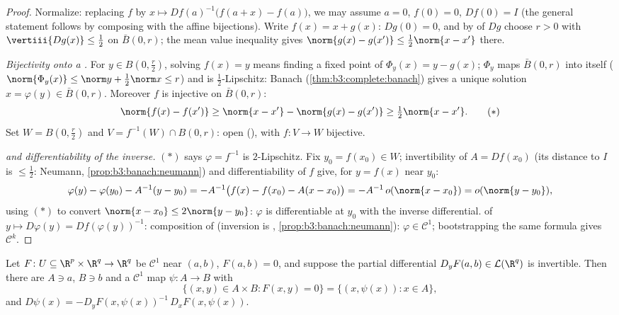 \begin{proof}
Normalize: replacing $f$ by $x \mapsto Df(a)^{-1}\bigl(f(a +
x) - f(a)\bigr)$, we may assume $a = 0$, $f(0) = 0$, $Df(0) =
I$ (the general statement follows by composing with the
affine bijections). Write $f(x) = x + g(x)$: $Dg(0) = 0$, and
by  of $Dg$ choose $r > 0$ with
$\vertiii{Dg(x)} \leq \frac12$ on $\bar B(0, r)$; the mean
value inequality gives $\norm{g(x) - g(x')} \leq \frac12
\norm{x - x'}$ there.

\emph{Bijectivity onto a .} For $y \in B(0,
\frac r2)$, solving $f(x) = y$ means finding a fixed point of
$\Phi_y(x) = y - g(x)$; $\Phi_y$ maps $\bar B(0, r)$ into
itself ($\norm{\Phi_y(x)} \leq \norm y + \frac12\norm x \leq
r$) and is $\frac12$-Lipschitz: Banach
(\cref{thm:b3:complete:banach}) gives a unique solution
$x = \varphi(y) \in \bar B(0,r)$. Moreover $f$ is injective
on $\bar B(0,r)$:
\[
\norm{f(x) - f(x')} \geq \norm{x - x'} - \norm{g(x) - g(x')}
\geq \tfrac12\norm{x - x'} .
\tag{$*$}
\]
Set $W = B(0, \frac r2)$ and $V = f^{-1}(W)\cap B(0, r)$:
open (), with $f \colon V \to W$ bijective.

\emph{ and differentiability of the inverse.} $(*)$
says $\varphi = f^{-1}$ is $2$-Lipschitz. Fix $y_0 = f(x_0)
\in W$; invertibility of $A = Df(x_0)$ (its distance to $I$
is $\leq \frac12$: Neumann,
\cref{prop:b3:banach:neumann}) and differentiability of $f$
give, for $y = f(x)$ near $y_0$:
\[
\varphi(y) - \varphi(y_0) - A^{-1}(y - y_0)
= -A^{-1}\bigl(f(x) - f(x_0) - A(x - x_0)\bigr)
= -A^{-1}\,o(\norm{x - x_0}) = o(\norm{y - y_0}),
\]
using $(*)$ to convert $\norm{x - x_0} \leq 2\norm{y - y_0}$:
$\varphi$ is differentiable at $y_0$ with the inverse
differential.  of $y \mapsto D\varphi(y) =
Df(\varphi(y))^{-1}$: composition of 
(inversion is ,
\cref{prop:b3:banach:neumann}): $\varphi \in \mathcal C^1$;
bootstrapping the same formula gives $\mathcal C^k$.
\end{proof}

\begin{theorem}
\label{thm:b3:submanifolds:implicit}
Let $F \colon U \subseteq \R^p\times\R^q \to \R^q$ be
$\mathcal C^1$ near $(a, b)$, $F(a,b) = 0$, and suppose the
partial differential $D_yF(a,b) \in \mathcal L(\R^q)$ is
invertible. Then there are  $A \ni a$, $B \ni b$
and a $\mathcal C^1$ map $\psi \colon A \to B$ with
\[
\bigl\{(x, y)\in A\times B : F(x,y) = 0\bigr\}
= \{(x, \psi(x)) : x \in A\},
\]
and $D\psi(x) = -D_yF(x, \psi(x))^{-1}\,D_xF(x,
\psi(x))$.
\end{theorem}

